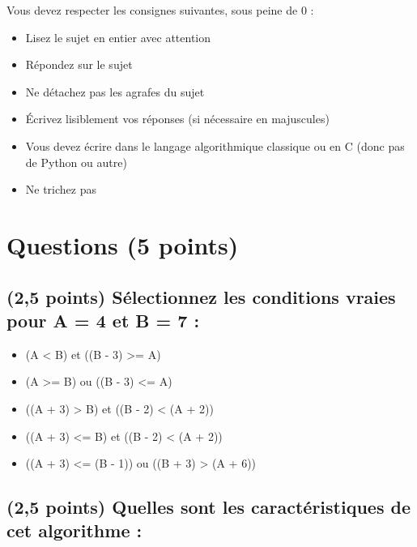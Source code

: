 \documentclass[11pt,a4paper]{article}
\begin{document}
\MakeExamTitle                   %


\bigskip

Vous devez respecter les consignes suivantes, sous peine de 0 :

\begin{itemize}
\item Lisez le sujet en entier avec attention
\item Répondez sur le sujet
\item Ne détachez pas les agrafes du sujet
\item \'Ecrivez lisiblement vos réponses (si nécessaire en majuscules)
\item Vous devez écrire dans le langage algorithmique classique ou en C (donc pas de Python ou autre)
\item Ne trichez pas
\end{itemize}


\vfillFirst

\section{Questions (5 points)}

\subsection{(2,5 points) Sélectionnez les conditions vraies pour A = 4 et B = 7 : }

\bigskip

\begin{itemize}
  \item[\checkmark] (A < B) et ((B - 3) >= A) %
  \item[\checkmark] (A >= B) ou ((B - 3) <= A) %
  \item[\CaseCoche] ((A + 3) > B) et ((B - 2) < (A + 2)) %
  \item[\checkmark] ((A + 3) <= B) et ((B - 2) < (A + 2)) %
  \item[\CaseCoche] ((A + 3) <= (B - 1)) ou ((B + 3) > (A + 6)) %
\end{itemize}




\subsection{(2,5 points) Quelles sont les caractéristiques de cet algorithme : }
\end{document}
